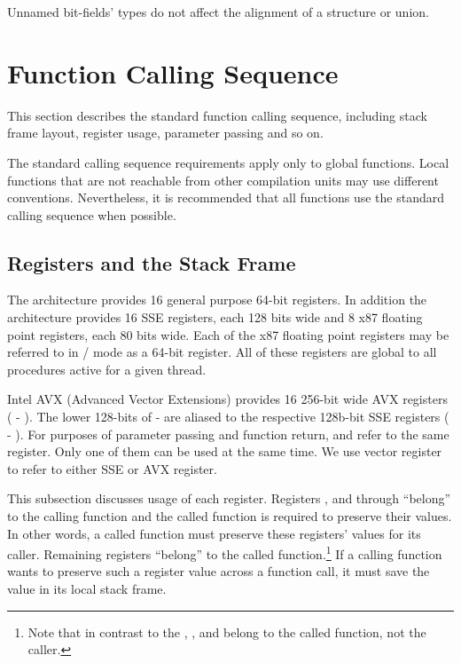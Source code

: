 Unnamed bit-fields' types do not affect the alignment of a structure
or union.


\section{Function Calling Sequence}

This section describes the standard function calling sequence,
including stack frame layout, register usage, parameter passing and so
on.

The standard calling sequence requirements apply only to global
functions.  Local functions that are not reachable from other
compilation units may use different conventions.  Nevertheless, it is
recommended that all functions use the standard calling sequence when
possible.

\subsection{Registers and the Stack Frame}
\label{subsec-registers}

The \xARCH architecture provides 16 general purpose 64-bit registers.
In addition the architecture provides 16 SSE registers, each 128 bits
wide and 8 x87 floating point registers, each 80 bits wide.  Each of
the x87 floating point registers may be referred to in \MMX/\threednow
mode as a 64-bit register.  All of these registers are global to all
procedures active for a given thread.

Intel AVX (Advanced Vector Extensions) provides 16 256-bit wide AVX registers
( - ).  The lower 128-bits of  - 
are aliased to the respective 128b-bit SSE registers ( -
). For purposes of parameter passing and function return,
 and  refer to the same register. Only one of them
can be used at the same time.  We use vector register to refer to either
SSE or AVX register.

This subsection discusses usage of each register.  Registers \RBP, \RBX and
 through  ``belong'' to the calling function and the
called function is required to preserve their values.  In other words,
a called function must preserve these registers' values for its
caller.  Remaining registers ``belong'' to the called
function.\footnote{Note that in contrast to the \intelabi, \RDI,
  and \RSI belong to the called function, not the caller.}  If a
calling function wants to preserve such a register value across a
function call, it must save the value in its local stack frame.

